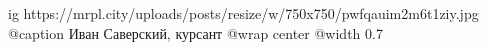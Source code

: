  
 
 
 
 

\ifcmt
  ig https://mrpl.city/uploads/posts/resize/w/750x750/pwfqauim2m6t1ziy.jpg
	@caption Иван Саверский, курсант
  @wrap center
  @width 0.7
\fi
